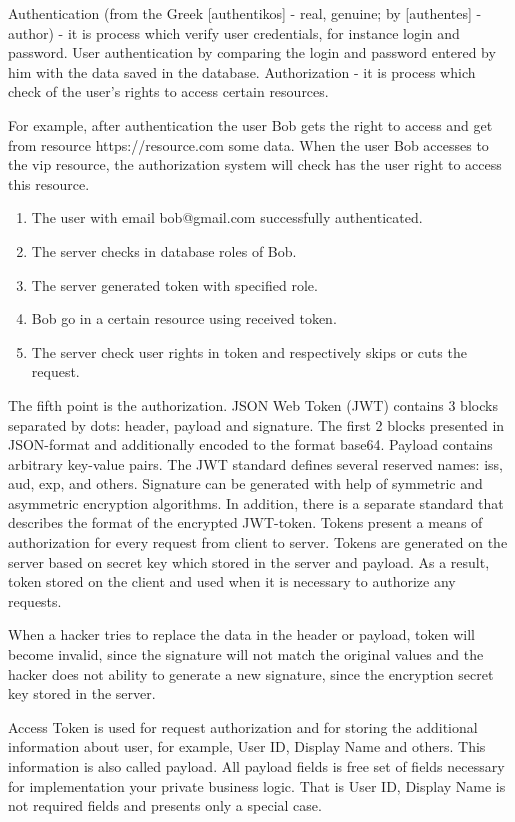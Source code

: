 Authentication (from the Greek [authentikos] - real, genuine;
by [authentes] - author) - it is process which verify user credentials, for instance login and password.
User authentication by comparing the login and password entered by him with the data saved in the database.
Authorization - it is process which check of the user's rights to access certain resources.

For example, after authentication the user Bob gets the right to access and get from resource
https://resource.com some data.
When the user Bob accesses to the vip resource, the authorization system will check has the user right to access
this resource.

\begin{enumerate}
    \item The user with email bob@gmail.com successfully authenticated.
    \item The server checks in database roles of Bob.
    \item The server generated token with specified role.
    \item Bob go in a certain resource using received token.
    \item The server check user rights in token and respectively skips or cuts the request.
\end{enumerate}

The fifth point is the authorization.
JSON Web Token (JWT) contains 3 blocks separated by dots: header, payload and signature.
The first 2 blocks presented in JSON-format and additionally encoded to the format base64.
Payload contains arbitrary key-value pairs.
The JWT standard defines several reserved names: iss, aud, exp, and others.
Signature can be generated with help of symmetric and asymmetric encryption algorithms.
In addition, there is a separate standard that describes the format of the encrypted JWT-token.
Tokens present a means of authorization for every request from client to server.
Tokens are generated on the server based on secret key which stored in the server and payload.
As a result, token stored on the client and used when it is necessary to authorize any requests.

When a hacker tries to replace the data in the header or payload, token will become invalid, since the signature
will not match the original values and the hacker does not ability to generate a new signature,
since the encryption secret key stored in the server.

Access Token is used for request authorization and for storing the additional information about user, for example,
User ID, Display Name and others.
This information is also called payload.
All payload fields is free set of fields necessary for implementation your private business logic.
That is User ID, Display Name is not required fields and presents only a special case.


